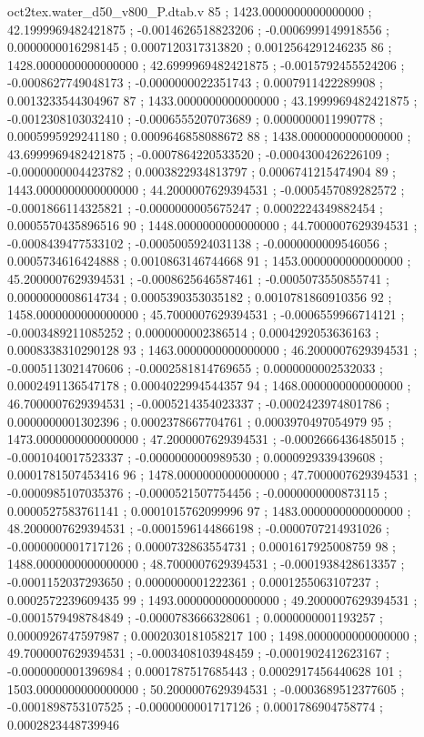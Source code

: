 \begin{filecontents}[overwrite]{oct2tex.water_d50_v800_P.dtab.v}
85 ; 1423.0000000000000000 ; 42.1999969482421875 ; -0.0014626518823206 ; -0.0006999149918556 ; 0.0000000016298145 ; 0.0007120317313820 ; 0.0012564291246235
86 ; 1428.0000000000000000 ; 42.6999969482421875 ; -0.0015792455524206 ; -0.0008627749048173 ; -0.0000000022351743 ; 0.0007911422289908 ; 0.0013233544304967
87 ; 1433.0000000000000000 ; 43.1999969482421875 ; -0.0012308103032410 ; -0.0006555207073689 ; 0.0000000011990778 ; 0.0005995929241180 ; 0.0009646858088672
88 ; 1438.0000000000000000 ; 43.6999969482421875 ; -0.0007864220533520 ; -0.0004300426226109 ; -0.0000000004423782 ; 0.0003822934813797 ; 0.0006741215474904
89 ; 1443.0000000000000000 ; 44.2000007629394531 ; -0.0005457089282572 ; -0.0001866114325821 ; -0.0000000005675247 ; 0.0002224349882454 ; 0.0005570435896516
90 ; 1448.0000000000000000 ; 44.7000007629394531 ; -0.0008439477533102 ; -0.0005005924031138 ; -0.0000000009546056 ; 0.0005734616424888 ; 0.0010863146744668
91 ; 1453.0000000000000000 ; 45.2000007629394531 ; -0.0008625646587461 ; -0.0005073550855741 ; 0.0000000008614734 ; 0.0005390353035182 ; 0.0010781860910356
92 ; 1458.0000000000000000 ; 45.7000007629394531 ; -0.0006559966714121 ; -0.0003489211085252 ; 0.0000000002386514 ; 0.0004292053636163 ; 0.0008338310290128
93 ; 1463.0000000000000000 ; 46.2000007629394531 ; -0.0005113021470606 ; -0.0002581814769655 ; 0.0000000002532033 ; 0.0002491136547178 ; 0.0004022994544357
94 ; 1468.0000000000000000 ; 46.7000007629394531 ; -0.0005214354023337 ; -0.0002423974801786 ; 0.0000000001302396 ; 0.0002378667704761 ; 0.0003970497054979
95 ; 1473.0000000000000000 ; 47.2000007629394531 ; -0.0002666436485015 ; -0.0001040017523337 ; -0.0000000000989530 ; 0.0000929339439608 ; 0.0001781507453416
96 ; 1478.0000000000000000 ; 47.7000007629394531 ; -0.0000985107035376 ; -0.0000521507754456 ; -0.0000000000873115 ; 0.0000527583761141 ; 0.0001015762099996
97 ; 1483.0000000000000000 ; 48.2000007629394531 ; -0.0001596144866198 ; -0.0000707214931026 ; -0.0000000001717126 ; 0.0000732863554731 ; 0.0001617925008759
98 ; 1488.0000000000000000 ; 48.7000007629394531 ; -0.0001938428613357 ; -0.0001152037293650 ; 0.0000000001222361 ; 0.0001255063107237 ; 0.0002572239609435
99 ; 1493.0000000000000000 ; 49.2000007629394531 ; -0.0001579498784849 ; -0.0000783666328061 ; 0.0000000001193257 ; 0.0000926747597987 ; 0.0002030181058217
100 ; 1498.0000000000000000 ; 49.7000007629394531 ; -0.0003408103948459 ; -0.0001902412623167 ; -0.0000000001396984 ; 0.0001787517685443 ; 0.0002917456440628
101 ; 1503.0000000000000000 ; 50.2000007629394531 ; -0.0003689512377605 ; -0.0001898753107525 ; -0.0000000001717126 ; 0.0001786904758774 ; 0.0002823448739946

\end{filecontents}
